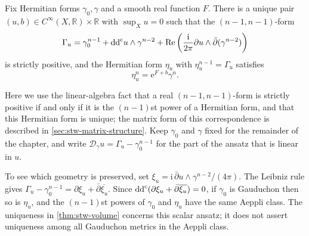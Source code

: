 \begin{theorem}
\label{thm:stw-volume}
Fix Hermitian forms $\gamma_0,\gamma$ and a smooth real function $F$. There is a unique pair $(u,b)\in C^\infty(X,\mathbb R)\times\mathbb R$ with $\sup_Xu=0$ such that the $(n-1,n-1)$-form
\[
 \Gamma_u=\gamma_0^{n-1}+\mathrm{dd}^{\mathrm{c}} u\wedge\gamma^{n-2}
 +\operatorname{Re}\left(
     \frac{\mathrm i}{2\pi}\partial u\wedge\bar\partial(\gamma^{n-2})
   \right)
\]
is strictly positive, and the Hermitian form $\eta_u$ with $\eta_u^{n-1}=\Gamma_u$ satisfies
\[
 \eta_u^n=\mathrm{e}^{F+b}\gamma^n.
\]
\end{theorem}

Here we use the linear-algebra fact that a real $(n-1,n-1)$-form is strictly positive if and only if it is the $(n-1)$st power of a Hermitian form, and that this Hermitian form is unique; the matrix form of this correspondence is described in \cref{sec:stw-matrix-structure}. Keep $\gamma_0$ and $\gamma$ fixed for the remainder of the chapter, and write $\mathcal D_\gamma u=\Gamma_u-\gamma_0^{n-1}$ for the part of the ansatz that is linear in $u$.

To see which geometry is preserved, set
$\xi_u=\mathrm i\,\bar\partial u\wedge\gamma^{n-2}/(4\pi)$.
The Leibniz rule gives
$\Gamma_u-\gamma_0^{n-1}=\partial\xi_u+\bar\partial\overline{\xi_u}$.
Since $\mathrm{dd}^{\mathrm{c}}(\partial\xi_u+\bar\partial\overline{\xi_u})=0$, if $\gamma_0$ is Gauduchon then so is $\eta_u$, and the $(n-1)$st powers of $\gamma_0$ and $\eta_u$ have the same Aeppli class. The uniqueness in \cref{thm:stw-volume} concerns this scalar ansatz; it does not assert uniqueness among all Gauduchon metrics in the Aeppli class.
















